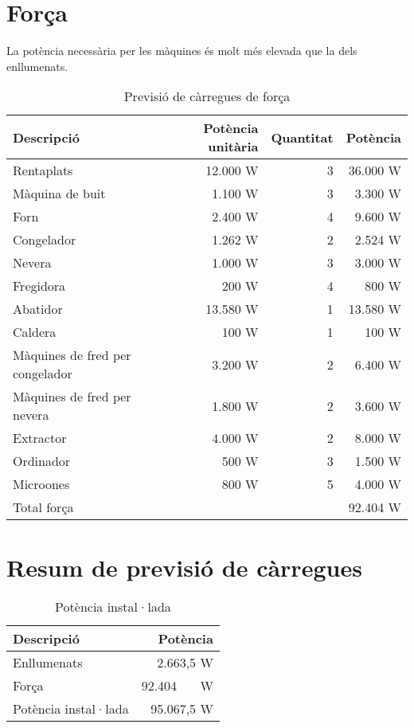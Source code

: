 \section{Força}
La potència necessària per les màquines és molt més elevada que la dels enllumenats. \\
%
\begin{table}[H]
\small
\begin{center}
 \begin{tabularx}{\textwidth}{|X|r|r|r|}%
 \hline
 Descripció & Potència unitària & Quantitat & Potència \\
 \hline
 Rentaplats & 12.000 W & 3 &  36.000 W \\
 Màquina de buit & 1.100 W & 3 &  3.300 W \\
 Forn & 2.400 W & 4 &  9.600 W\\ 
 Congelador & 1.262 W & 2 &  2.524 W \\
 Nevera & 1.000 W & 3 &  3.000 W \\
 Fregidora & 200 W & 4 &  800 W \\
 Abatidor & 13.580 W & 1 &  13.580 W\\ 
 Caldera & 100 W & 1 &  100 W \\
 Màquines de fred per congelador & 3.200 W & 2 & 6.400 W \\
 Màquines de fred per nevera & 1.800 W & 2 &  3.600 W \\
 Extractor & 4.000 W & 2 & 8.000 W \\
 Ordinador & 500 W & 3 &  1.500 W \\
 Microones & 800 W & 5 & 4.000 W \\
 \hline
 Total força & & &  92.404 W\\
 \hline
 \end{tabularx}
 \caption{Previsió de càrregues de força}
\end{center}
\end{table}
%
%
%


\section{Resum de previsió de càrregues}
\begin{table}[H]
\small
\begin{center}
 \begin{tabular}{|l|r|}%
 \hline
 Descripció  & Potència \\
 \hline
  Enllumenats & 2.663,5 W \\
  Força &  92.404 \ \ \ W \\ 
 \hline
 Potència instal·lada & 95.067,5 W\\
 \hline
 \end{tabular}
 \caption{Potència instal·lada}
\end{center}
\end{table}

